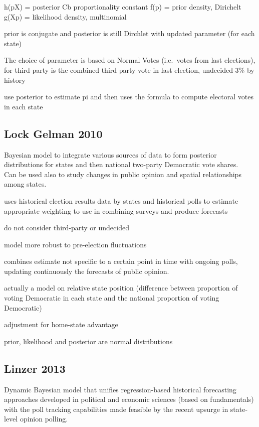 \documentclass[
  12pt]{article}
\begin{document}
h(p\textbar X) = posterior Cb proportionality constant f(p) = prior
density, Dirichelt g(X\textbar p) = likelihood density, multinomial

prior is conjugate and posterior is still Dirchlet with updated
parameter (for each state)

The choice of parameter is based on Normal Votes (i.e.~votes from last
elections), for third-party is the combined third party vote in last
election, undecided 3\% by history

use posterior to estimate pi and then uses the formula to compute
electoral votes in each state

\hypertarget{lock-gelman-2010}{%
\subsection{Lock Gelman 2010}\label{lock-gelman-2010}}

Bayesian model to integrate various sources of data to form posterior
distributions for states and then national two-party Democratic vote
shares.\\
Can be used also to study changes in public opinion and spatial
relationships among states.

uses historical election results data by states and historical polls to
estimate appropriate weighting to use in combining surveys and produce
forecasts

do not consider third-party or undecided

model more robust to pre-election fluctuations

combines estimate not specific to a certain point in time with ongoing
polls, updating continuously the forecasts of public opinion.

actually a model on relative state position (difference between
proportion of voting Democratic in each state and the national
proportion of voting Democratic)

adjustment for home-state advantage

prior, likelihood and posterior are normal distributions

\hypertarget{linzer-2013}{%
\subsection{Linzer 2013}\label{linzer-2013}}

Dynamic Bayesian model that unifies regression-based historical
forecasting approaches developed in political and economic sciences
(based on fundamentals) with the poll tracking capabilities made
feasible by the recent upsurge in state-level opinion polling.
\end{document}
